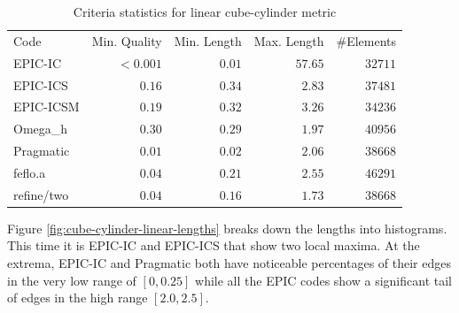 \documentclass[3p,times,procedia,number]{elsarticle}
\begin{document}
\begin{table}
\caption{Criteria statistics for linear cube-cylinder metric}
\label{tab:cube-cylinder-linear-stats}
\begin{tabular}{lrrrr}
Code & Min. Quality & Min. Length & Max. Length & \#Elements\\
EPIC-IC    &$<0.001$&       $0.01$&      $57.65$&    $32711$\\
EPIC-ICS   &  $0.16$&       $0.34$&      $ 2.83$&    $37481$\\
EPIC-ICSM  &  $0.19$&       $0.32$&      $ 3.26$&    $34236$\\
Omega\_h   &  $0.30$&       $0.29$&      $ 1.97$&    $40956$\\
Pragmatic  &  $0.01$&       $0.02$&      $ 2.06$&    $38668$\\
feflo.a    &  $0.04$&       $0.21$&      $ 2.55$&    $46291$\\
refine/two &  $0.04$&       $0.16$&      $ 1.73$&    $38668$\\
\end{tabular}
\end{table}

Figure \ref{fig:cube-cylinder-linear-lengths} breaks down the
lengths into histograms.
This time it is EPIC-IC and EPIC-ICS that show two local maxima.
At the extrema, EPIC-IC and Pragmatic both have noticeable
percentages of their edges in the very low range of $[0,0.25]$
while all the EPIC codes show a significant tail of edges
in the high range $[2.0,2.5]$.
\end{document}
